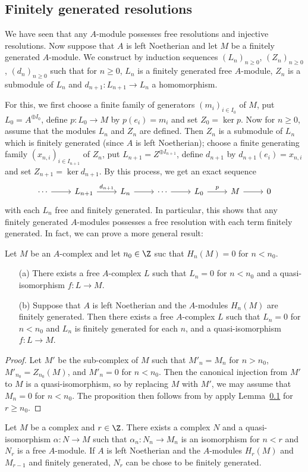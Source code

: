 \subsection{Finitely generated resolutions}
We have seen that any $A$-module possesses free resolutions and injective resolutions. Now suppose that $A$ is left Noetherian and let $M$ be a finitely generated $A$-module. We construct by induction sequences $(L_n)_{n\geq 0}$, $(Z_n)_{n\geq 0}$, $(d_n)_{n\geq 0}$ such that for $n\geq 0$, $L_n$ is a finitely generated free $A$-module, $Z_n$ is a submodule of $L_n$ and $d_{n+1}:L_{n+1}\to L_n$ a homomorphism.\par
For this, we first choose a finite family of generators $(m_i)_{i\in I_0}$ of $M$, put $L_0=A^{\oplus I_0}$, define $p:L_0\to M$ by $p(e_i)=m_i$ and set $Z_0=\ker p$. Now for $n\geq 0$, assume that the modules $L_n$ and $Z_n$ are defined. Then $Z_n$ is a submodule of $L_n$ which is finitely generated (since $A$ is left Noetherian); choose a finite generating family $(x_{n,i})_{i\in I_{n+1}}$ of $Z_n$, put $L_{n+1}=Z^{\oplus I_{n+1}}$, define $d_{n+1}$ by $d_{n+1}(e_i)=x_{n,i}$ and set $Z_{n+1}=\ker d_{n+1}$. By this process, we get an exact sequence
\[\begin{tikzcd}
\cdots\ar[r]&L_{n+1}\ar[r,"d_{n+1}"]&L_n\ar[r]&\cdots\ar[r]&L_0\ar[r,"p"]&M\ar[r]&0
\end{tikzcd}\]
with each $L_n$ free and finitely generated. In particular, this shows that any finitely generated $A$-modules possesses a free resolution with each term finitely generated. In fact, we can prove a more general result:
\begin{proposition}\label{module complex finite resolution for complex}
Let $M$ be an $A$-complex and let $n_0\in\Z$ suc that $H_n(M)=0$ for $n<n_0$.
\begin{itemize}
\item[(a)] There exists a free $A$-complex $L$ such that $L_n=0$ for $n<n_0$ and a quasi-isomorphism $f:L\to M$.
\item[(b)] Suppose that $A$ is left Noetherian and the $A$-modules $H_n(M)$ are finitely generated. Then there exists a free $A$-complex $L$ such that $L_n=0$ for $n<n_0$ and $L_n$ is finitely generated for each $n$, and a quasi-isomorphism $f:L\to M$.
\end{itemize}
\end{proposition}
\begin{proof}
Let $M'$ be the sub-complex of $M$ such that $M'_n=M_n$ for $n>n_0$, $M'_{n_0}=Z_{n_0}(M)$, and $M'_n=0$ for $n<n_0$. Then the canonical injection from $M'$ to $M$ is a quasi-isomorphism, so by replacing $M$ with $M'$, we may assume that $M_n=0$ for $n<n_0$. The proposition then follows from by apply Lemma~\ref{} for $r\geq n_0$.
\end{proof}
\begin{lemma}
Let $M$ be a complex and $r\in\Z$. There exists a complex $N$ and a quasi-isomorphism $\alpha:N\to M$ such that $\alpha_n:N_n\to M_n$ is an isomorphism for $n<r$ and $N_r$ is a free $A$-module. If $A$ is left Noetherian and the $A$-modules $H_r(M)$ and $M_{r-1}$ and finitely generated, $N_r$ can be chose to be finitely generated.
\end{lemma}
